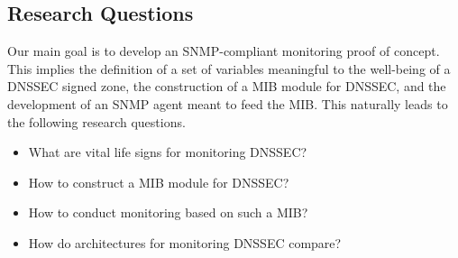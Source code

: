 \subsection{Research Questions}
Our main goal is to develop an SNMP-compliant monitoring proof of concept. This implies the definition of a set of variables meaningful to the well-being of a DNSSEC signed zone, the construction of a MIB module for DNSSEC, and the development of an SNMP agent meant to feed the MIB. This naturally leads to the following research questions.
\begin{itemize}
\item What are vital life signs for monitoring DNSSEC?
\item How to construct a MIB module for DNSSEC?
\item How to conduct monitoring based on such a MIB?
\item How do architectures for monitoring DNSSEC compare?
\end{itemize}